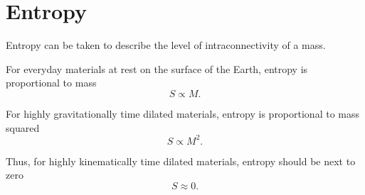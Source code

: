 \documentclass[10pt]{article}
\theoremstyle{definition}
\theoremstyle{remark}
\begin{document}
\section{Entropy}

Entropy can be taken to describe the level of intraconnectivity of a mass.

For everyday materials at rest on the surface of the Earth, entropy is proportional to mass
\begin{equation}
S \propto M.
\end{equation}

For highly gravitationally time dilated materials, entropy is proportional to mass squared
\begin{equation}
S \propto M^2.
\end{equation}

Thus, for highly kinematically time dilated materials, entropy should be next to zero
\begin{equation}
S \approx 0.
\end{equation}
\end{document}
